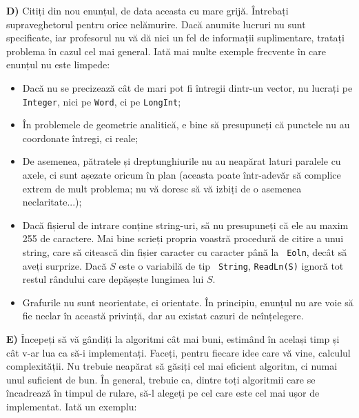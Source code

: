 {\bf D)} Citiți din nou enunțul, de data aceasta cu mare grijă. Întrebați
supraveghetorul pentru orice nelămurire. Dacă anumite lucruri nu sunt
specificate, iar profesorul nu vă dă nici un fel de informații suplimentare,
tratați problema în cazul cel mai general. Iată mai multe exemple frecvente în
care enunțul nu este limpede:

\begin{itemize}

\item Dacă nu se precizează cât de mari pot fi întregii dintr-un vector, nu
  lucrați pe {\tt Integer}, nici pe {\tt Word}, ci pe {\tt LongInt};

\item În problemele de geometrie analitică, e bine să presupuneți că punctele
  nu au coordonate întregi, ci reale;

\item De asemenea, pătratele și dreptunghiurile nu au neapărat laturi paralele
  cu axele, ci sunt așezate oricum în plan (aceasta poate într-adevăr să
  complice extrem de mult problema; nu vă doresc să vă izbiți de o asemenea
  neclaritate...);
  
\item Dacă fișierul de intrare conține string-uri, să nu presupuneți că ele au
  maxim 255 de caractere. Mai bine scrieți propria voastră procedură de citire
  a unui string, care să citească din fișier caracter cu caracter până la {\tt
    Eoln}, decât să aveți surprize. Dacă $S$ este o variabilă de tip {\tt
    String}, {\tt ReadLn(S)} ignoră tot restul rândului care depășește
  lungimea lui $S$.
  
\item Grafurile nu sunt neorientate, ci orientate. În principiu, enunțul nu
  are voie să fie neclar în această privință, dar au existat cazuri de
  neînțelegere.

\end{itemize}

{\bf E)} Începeți să vă gândiți la algoritmi cât mai buni, estimând în același
timp și cât v-ar lua ca să-i implementați. Faceți, pentru fiecare idee care vă
vine, calculul complexității. Nu trebuie neapărat să găsiți cel mai eficient
algoritm, ci numai unul suficient de bun. În general, trebuie ca, dintre toți
algoritmii care se încadrează în timpul de rulare, să-l alegeți pe cel care
este cel mai ușor de implementat. Iată un exemplu:

